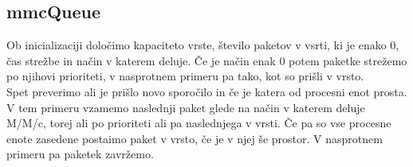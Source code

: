 \documentclass[a4paper,11pt]{article}
\begin{document}
\subsection{mmcQueue}

Ob inicializaciji določimo kapaciteto vrste, število paketov v vsrti, ki je enako 0, čas strežbe in način v katerem deluje. Če je način enak 0 potem paketke strežemo po njihovi prioriteti, v nasprotnem primeru pa tako, kot so prišli v vrsto.\\
Spet preverimo ali je prišlo novo sporočilo in če je katera od procesni enot prosta. V tem primeru vzamemo naslednji paket glede na način v katerem deluje M/M/c, torej ali po prioriteti ali pa naslednjega v vrsti. Če pa so vse procesne enote zasedene postaimo paket v vrsto, če je v njej še prostor. V nasprotnem primeru pa paketek zavržemo.
\end{document}
